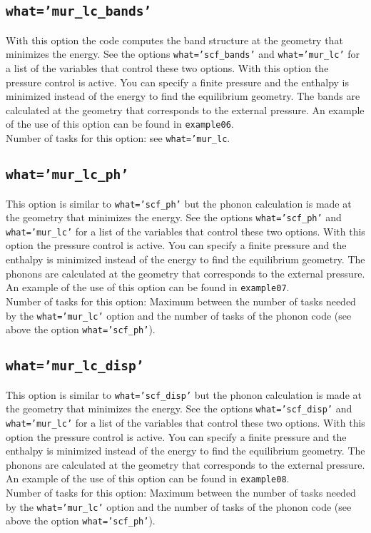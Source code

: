 \documentclass[12pt,a4paper]{article}
\begin{document}
\subsection{\color{web-blue}\texttt{what='mur\_lc\_bands'}}
With this option the code computes the band structure at the geometry 
that minimizes the energy. See the options 
\texttt{what='scf\_bands'} and \texttt{what='mur\_lc'} for a list of 
the variables that control these two options. 
With this option the pressure control is active. You can specify a
finite pressure and the enthalpy is minimized instead of the
energy to find the equilibrium geometry. The bands are calculated
at the geometry that corresponds to the external pressure.
An example of the use of this option can be found in \texttt{example06}. \\
Number of tasks for this option: see \texttt{what='mur\_lc}.

\subsection{\color{web-blue}\texttt{what='mur\_lc\_ph'}}
This option is similar to \texttt{what='scf\_ph'} but the phonon calculation
is made at the geometry that minimizes the energy.
See the options \texttt{what='scf\_ph'} and \texttt{what='mur\_lc'} for a
list of the variables that control these two options. 
With this option the pressure control is active. You can specify a
finite pressure and the enthalpy is minimized instead of the
energy to find the equilibrium geometry. The phonons are calculated
at the geometry that corresponds to the external pressure.
An example of the use of this option can be found in \texttt{example07}. \\
Number of tasks for this option: Maximum between the number of tasks 
needed by the \texttt{what='mur\_lc'} option and the number
of tasks of the phonon code (see above the option \texttt{what='scf\_ph'}).

\subsection{\color{web-blue}\texttt{what='mur\_lc\_disp'}}
This option is similar to \texttt{what='scf\_disp'} but the phonon calculation
is made at the geometry that minimizes the energy.
See the options \texttt{what='scf\_disp'} and \texttt{what='mur\_lc'} for a
list of the variables that control these two options. 
With this option the pressure control is active. You can specify a
finite pressure and the enthalpy is minimized instead of the
energy to find the equilibrium geometry. The phonons are calculated
at the geometry that corresponds to the external pressure.
An example of the use of this option can be found in \texttt{example08}. \\
Number of tasks for this option: Maximum between the number of tasks  
needed by the \texttt{what='mur\_lc'} option and the number
of tasks of the phonon code (see above the option \texttt{what='scf\_ph'}).
\end{document}
